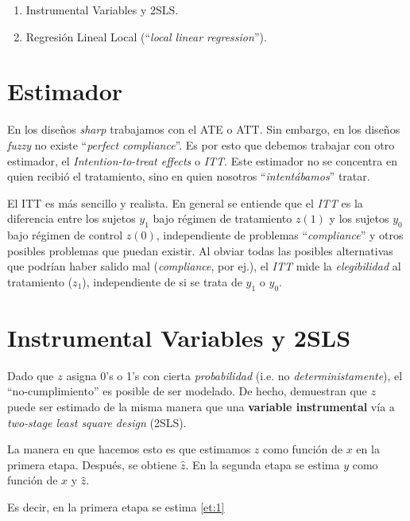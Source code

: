 \documentclass[onesided]{article}\usepackage[]{graphicx}\usepackage[]{color}
\begin{document}
\begin{enumerate}
  \item Instrumental Variables y 2SLS.
  \item Regresi\'on Lineal Local (``\emph{local linear regression}'').
\end{enumerate}

\section{Estimador}

En los dise\~nos \emph{sharp} trabajamos con el ATE o ATT. Sin embargo, en los dise\~nos \emph{fuzzy} no existe ``\emph{perfect compliance}''. Es por esto que debemos trabajar con otro estimador, el \emph{Intention-to-treat effects} o \emph{ITT}. Este estimador no se concentra en quien recibi\'o el tratamiento, sino en quien nosotros ``\emph{intent\'abamos}'' tratar.

El ITT es m\'as sencillo y realista. En general se entiende que el \emph{ITT} es la diferencia entre los sujetos $y_{1}$ bajo r\'egimen de tratamiento $z(1)$ y los sujetos $y_{0}$ bajo r\'egimen de control $z(0)$, independiente de problemas ``\emph{compliance}'' y otros posibles problemas que puedan existir. Al obviar todas las posibles alternativas que podr\'ian haber salido mal (\emph{compliance}, por ej.), el \emph{ITT} mide la \emph{elegibilidad} al tratamiento ($z_{1}$), independiente de si se trata de $y_{1}$ o $y_{0}$.


\section{Instrumental Variables y 2SLS}

Dado que $z$ asigna 0's o 1's con cierta \emph{probabilidad} (i.e. no \emph{deterministamente}), el ``no-cumplimiento'' es posible de ser modelado. De hecho, \textcite[]{Hahn2001a} demuestran que $z$ puede ser estimado de la misma manera que una {\bf variable instrumental} v\'ia a \emph{two-stage least square design} (2SLS). 

La manera en que hacemos esto es que estimamos $z$ como funci\'on de $x$ en la primera etapa. Despu\'es, se obtiene $\hat z$. En la segunda etapa se estima $y$ como funci\'on de $x$ y $\hat z$.

Es decir, en la primera etapa se estima \autoref{et:1}
\end{document}
